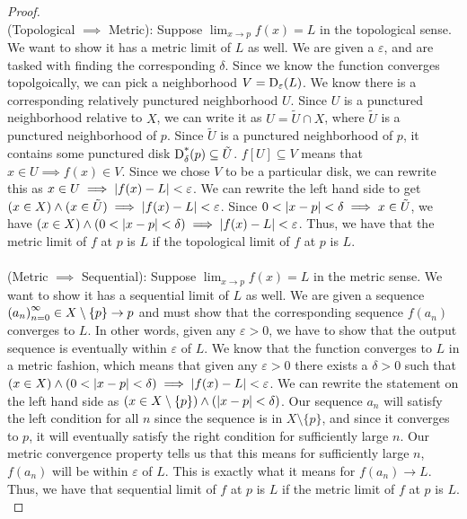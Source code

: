\begin{proof}
\\(Topological $\implies$ Metric): Suppose $\lim_{x \to p} f(x) = L$ in the topological sense. We want to show it has a metric limit of $L$ as well. We are given a $\varepsilon$, and are tasked with finding the corresponding $\delta$. Since we know the function converges topolgoically, we can pick a neighborhood $V = \operatorname{D_{\varepsilon}} ({L})$. We know there is a corresponding relatively punctured neighborhood $U$. Since $U$ is a punctured neighborhood relative to $X$, we can write it as $U = \tilde{U} \cap X$, where $\tilde{U}$ is a punctured neighborhood of $p$. Since $\tilde{U}$ is a punctured neighborhood of $p$, it contains some punctured disk $\operatorname{D^*_{\delta}} ({p}) \subseteq \tilde{U}$. $f[U]\subseteq V$ means that $x \in U \implies f(x) \in V$. Since we chose $V$ to be a particular disk, we can rewrite this as $x \in U \implies \left\lvert f(x)-L \right\rvert < \varepsilon$. We can rewrite the left hand side to get $(x \in X) \land (x \in \tilde{U}) \implies \left\lvert f(x)-L \right\rvert < \varepsilon$. Since $0 < \left\lvert x-p \right\rvert< \delta \implies x \in \tilde{U}$, we have $(x \in X) \land (0 < \left\lvert x-p \right\rvert < \delta) \implies \left\lvert f(x)-L \right\rvert < \varepsilon$. Thus, we have that the metric limit of $f$ at $p$ is $L$ if the topological limit of $f$ at $p$ is $L$.\\
\\(Metric $\implies$ Sequential): Suppose $\lim_{x \to p} f(x) = L$ in the metric sense. We want to show it has a sequential limit of $L$ as well. We are given a sequence $\seq{a} \in X \setminus\{p\} \to p$ and must show that the corresponding sequence $f(a_n)$ converges to $L$. In other words, given any $\varepsilon > 0$, we have to show that the output sequence is eventually within $\varepsilon$ of $L$. We know that the function converges to $L$ in a metric fashion, which means that given any $\varepsilon > 0$ there exists a $\delta > 0$ such that $(x \in X) \land (0 < \left\lvert x-p \right\rvert < \delta) \implies \left\lvert f(x)-L \right\rvert < \varepsilon$. We can rewrite the statement on the left hand side as $(x \in X\setminus\{p\}) \land (\left\lvert x-p \right\rvert < \delta)$. Our sequence $a_n$ will satisfy the left condition for all $n$ since the sequence is in $X\setminus\{p\}$, and since it converges to $p$, it will eventually satisfy the right condition for sufficiently large $n$. Our metric convergence property tells us that this means for sufficiently large $n$, $f(a_n)$ will be within $\varepsilon$ of $L$. This is exactly what it means for $f(a_n) \to L$. Thus, we have that sequential limit of $f$ at $p$ is $L$ if the metric limit of $f$ at $p$ is $L$.\\

\end{proof}
